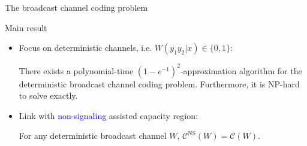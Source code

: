 \documentclass{beamer}
\theoremstyle{definition}
\theoremstyle{remark}
\begin{document}
\begin{frame}{The broadcast channel coding problem}
\begin{itemize}
{\begin{center}
    \end{center}}
  \end{itemize}
\end{frame}

\begin{frame}{Main result}
  \begin{itemize}
    \item Focus on \alert{deterministic} channels, i.e. $W(y_1y_2|x) \in \{0,1\}$:
  \begin{theorem} 
  There exists a polynomial-time $(1-e^{-1})^2$-approximation algorithm for the deterministic broadcast channel coding problem. Furthermore, it is \textrm{NP}-hard to solve exactly.
  \end{theorem}
  \pause
  \bigskip
\item Link with \textcolor{blue}{non-signaling} assisted capacity region:
  \begin{corollary}
  For any deterministic broadcast channel $W$, $\mathcal{C}^{\mathrm{NS}}(W)=\mathcal{C}(W)$.
  \end{corollary}
  \end{itemize}
\end{frame}
\end{document}
